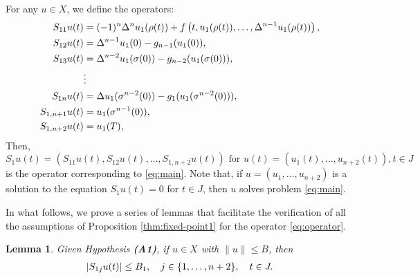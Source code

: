 \documentclass[reqno, 12pt]{amsart}
\newtheorem{lemma}[theorem]{Lemma}
\numberwithin{equation}{section}
\begin{document}
For any $u \in X$, we define the operators:
\begin{align}
S_{11}u(t) &= (-1)^n\Delta^n u_1(\rho(t)) + f\left(t, u_1(\rho(t)), \ldots, \Delta^{n-1}u_1(\rho(t))\right), \notag\\
S_{12}u(t) &= \Delta^{n-1}u_1(0) - g_{n-1}(u_1(0)), \notag\\
S_{13}u(t) &= \Delta^{n-2}u_1(\sigma(0)) - g_{n-2}(u_1(\sigma(0))), \notag\\
&\vdots \notag\\
S_{1n}u(t) &= \Delta u_1(\sigma^{n-2}(0)) - g_1(u_1(\sigma^{n-2}(0))), \notag\\
S_{1,n+1}u(t) &= u_1(\sigma^{n-1}(0)), \notag\\
S_{1,n+2}u(t) &= u_1(T), \notag
\end{align}
Then,
\begin{equation}
\label{eq:operator}
 S_1u(t) = (S_{11}u(t), S_{12}u(t), \ldots, S_{1,n+2}u(t)) \mbox{ for }u(t) = (u_1(t), \ldots, u_{n+2}(t)), t \in J   
\end{equation}
is the operator corresponding to \eqref{eq:main}. Note that, if $u = (u_1, \ldots, u_{n+2})$ is a solution to the equation $S_1u(t) = 0$ for $t \in J$, then $u$ solves problem \eqref{eq:main}. 

In what follows, we prove a series of lemmas that facilitate the verification of all the assumptions of Proposition \ref{thm:fixed-point1} for the operator \ref{eq:operator}. 

\begin{lemma} \label{lem:S1-bound}
Given Hypothesis {\bf (A1)}, if $u \in X$ with $\|u\| \leq B$, then
\begin{align}
|S_{1j}u(t)| \leq B_1, \quad j \in \{1, \ldots, n+2\}, \quad t \in J. \notag
\end{align}
\end{lemma}
\end{document}
